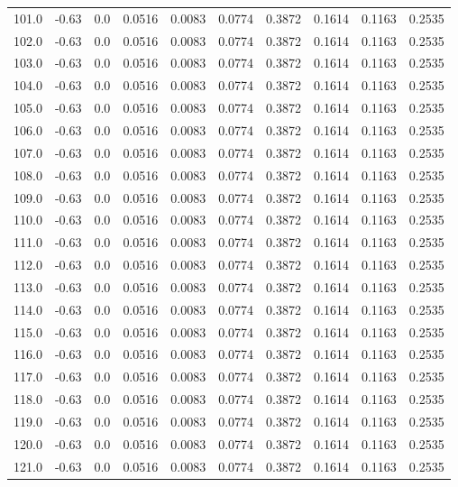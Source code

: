 \begin{longtable}{lrrrrrrrrr}
101.0 & -0.63 & 0.0 & 0.0516 & 0.0083 & 0.0774 & 0.3872 & 0.1614 & 0.1163 & 0.2535 \\
102.0 & -0.63 & 0.0 & 0.0516 & 0.0083 & 0.0774 & 0.3872 & 0.1614 & 0.1163 & 0.2535 \\
103.0 & -0.63 & 0.0 & 0.0516 & 0.0083 & 0.0774 & 0.3872 & 0.1614 & 0.1163 & 0.2535 \\
104.0 & -0.63 & 0.0 & 0.0516 & 0.0083 & 0.0774 & 0.3872 & 0.1614 & 0.1163 & 0.2535 \\
105.0 & -0.63 & 0.0 & 0.0516 & 0.0083 & 0.0774 & 0.3872 & 0.1614 & 0.1163 & 0.2535 \\
106.0 & -0.63 & 0.0 & 0.0516 & 0.0083 & 0.0774 & 0.3872 & 0.1614 & 0.1163 & 0.2535 \\
107.0 & -0.63 & 0.0 & 0.0516 & 0.0083 & 0.0774 & 0.3872 & 0.1614 & 0.1163 & 0.2535 \\
108.0 & -0.63 & 0.0 & 0.0516 & 0.0083 & 0.0774 & 0.3872 & 0.1614 & 0.1163 & 0.2535 \\
109.0 & -0.63 & 0.0 & 0.0516 & 0.0083 & 0.0774 & 0.3872 & 0.1614 & 0.1163 & 0.2535 \\
110.0 & -0.63 & 0.0 & 0.0516 & 0.0083 & 0.0774 & 0.3872 & 0.1614 & 0.1163 & 0.2535 \\
111.0 & -0.63 & 0.0 & 0.0516 & 0.0083 & 0.0774 & 0.3872 & 0.1614 & 0.1163 & 0.2535 \\
112.0 & -0.63 & 0.0 & 0.0516 & 0.0083 & 0.0774 & 0.3872 & 0.1614 & 0.1163 & 0.2535 \\
113.0 & -0.63 & 0.0 & 0.0516 & 0.0083 & 0.0774 & 0.3872 & 0.1614 & 0.1163 & 0.2535 \\
114.0 & -0.63 & 0.0 & 0.0516 & 0.0083 & 0.0774 & 0.3872 & 0.1614 & 0.1163 & 0.2535 \\
115.0 & -0.63 & 0.0 & 0.0516 & 0.0083 & 0.0774 & 0.3872 & 0.1614 & 0.1163 & 0.2535 \\
116.0 & -0.63 & 0.0 & 0.0516 & 0.0083 & 0.0774 & 0.3872 & 0.1614 & 0.1163 & 0.2535 \\
117.0 & -0.63 & 0.0 & 0.0516 & 0.0083 & 0.0774 & 0.3872 & 0.1614 & 0.1163 & 0.2535 \\
118.0 & -0.63 & 0.0 & 0.0516 & 0.0083 & 0.0774 & 0.3872 & 0.1614 & 0.1163 & 0.2535 \\
119.0 & -0.63 & 0.0 & 0.0516 & 0.0083 & 0.0774 & 0.3872 & 0.1614 & 0.1163 & 0.2535 \\
120.0 & -0.63 & 0.0 & 0.0516 & 0.0083 & 0.0774 & 0.3872 & 0.1614 & 0.1163 & 0.2535 \\
121.0 & -0.63 & 0.0 & 0.0516 & 0.0083 & 0.0774 & 0.3872 & 0.1614 & 0.1163 & 0.2535 \\

\end{longtable}
